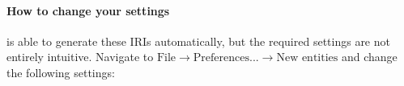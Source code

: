 
\paragraph{How to change your settings}\label{how-to-change-your-settings}
{\protege} is able to generate these IRIs automatically, but the required settings are not entirely intuitive. Navigate to \textit{$\text{File}\rightarrow\text{Preferences...}\rightarrow\text{New entities}$} and change the following settings:

